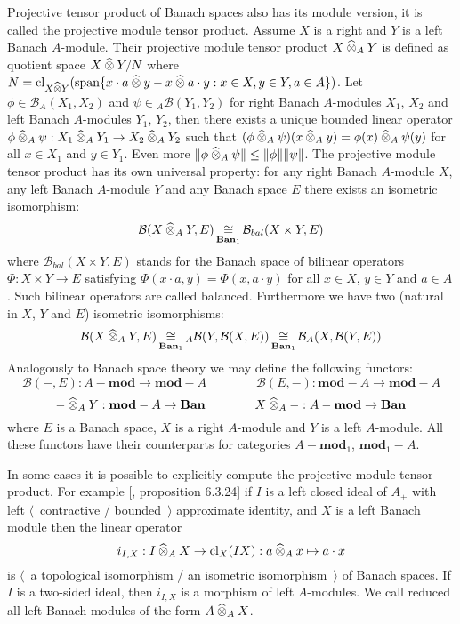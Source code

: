 Projective tensor product of Banach spaces also has its module version, it is called the projective module tensor product. Assume $X$ is a right and $Y$ is a left Banach $A$-module. Their projective module tensor product $X\mathbin{\widehat{\otimes}}_{A}Y$ is defined as quotient space $X\mathbin{\widehat{\otimes}} Y / N$ where $N=\operatorname{cl}_{X\mathbin{\widehat{\otimes}} Y}(\operatorname{span}\{x\cdot a\mathbin{\widehat{\otimes}} y-x\mathbin{\widehat{\otimes}} a\cdot y:x\in X,y\in Y,a\in A\})$. Let $\phi\in\mathcal{B}_A(X_1,X_2)$ and $\psi\in{}_A\mathcal{B}(Y_1,Y_2)$ for right Banach $A$-modules $X_1$, $X_2$ and left Banach $A$-modules $Y_1$, $Y_2$, then there exists a unique bounded linear operator $\phi\mathbin{\widehat{\otimes}}_{A} \psi:X_1\mathbin{\widehat{\otimes}}_{A} Y_1\to X_2\mathbin{\widehat{\otimes}}_{A} Y_2$ such that $(\phi\mathbin{\widehat{\otimes}}_{A} \psi)(x\mathbin{\widehat{\otimes}}_{A} y)=\phi(x)\mathbin{\widehat{\otimes}}_{A} \psi(y)$ for all $x\in X_1$ and $y\in Y_1$. Even more $\Vert \phi\mathbin{\widehat{\otimes}}_{A} \psi\Vert\leq\Vert \phi\Vert\Vert \psi\Vert$. The projective module tensor product has its own universal property: for any right Banach $A$-module $X$, any left Banach $A$-module $Y$ and any Banach space $E$ there exists an isometric isomorphism:
$$
\mathcal{B}(X\mathbin{\widehat{\otimes}}_{A}Y,E)\mathop{\mathbin{\cong}}\limits_{\mathbf{Ban}_1}\mathcal{B}_{bal}(X\times Y, E)
$$
where $\mathcal{B}_{bal}(X\times Y, E)$ stands for the Banach space of bilinear operators $\Phi:X\times Y\to E$ satisfying $\Phi(x\cdot a,y)=\Phi(x,a\cdot y)$ for all $x\in X$, $y\in Y$ and $a\in A$. Such bilinear operators are called balanced.
Furthermore we have two (natural in $X$, $Y$ and $E$) isometric isomorphisms:
$$
\mathcal{B}(X\mathbin{\widehat{\otimes}}_{A}Y,E)
\mathop{\mathbin{\cong}}\limits_{\mathbf{Ban}_1}
{}_A\mathcal{B}(Y,\mathcal{B}(X,E))
\mathop{\mathbin{\cong}}\limits_{\mathbf{Ban}_1}
\mathcal{B}_A(X,\mathcal{B}(Y,E))
$$
Analogously to Banach space theory we may define the following functors:
$$
\mathcal{B}(-,E):A-\mathbf{mod}\to \mathbf{mod}-A
\qquad\qquad
\mathcal{B}(E,-):\mathbf{mod}-A\to \mathbf{mod}-A
$$
$$
-\mathbin{\widehat{\otimes}}_{A} Y:\mathbf{mod}-A\to\mathbf{Ban}
\qquad\qquad
X\mathbin{\widehat{\otimes}}_{A} -:A-\mathbf{mod}\to\mathbf{Ban}
$$
where $E$ is a Banach space, $X$ is a right $A$-module and $Y$ is a left $A$-module. All these functors have their counterparts for categories $A-\mathbf{mod}_1$, $\mathbf{mod}_1-A$. 

In some cases it is possible to explicitly compute the projective module tensor product. For example [\cite{HelBanLocConvAlg}, proposition 6.3.24] if $I$ is a left closed ideal of $A_+$ with left $\langle$~contractive / bounded~$\rangle$ approximate identity, and $X$ is a left Banach module then the linear operator 
$$
i_{I,X}:I\mathbin{\widehat{\otimes}}_{A}X \to \operatorname{cl}_X(IX):a\mathbin{\widehat{\otimes}}_{A} x\mapsto a\cdot x
$$
is $\langle$~a topological isomorphism / an isometric isomorphism~$\rangle$ of Banach spaces. If $I$ is a two-sided ideal, then $i_{I,X}$ is a morphism of left $A$-modules. We call reduced all left Banach modules of the form $A\mathbin{\widehat{\otimes}}_{A}X$. 

